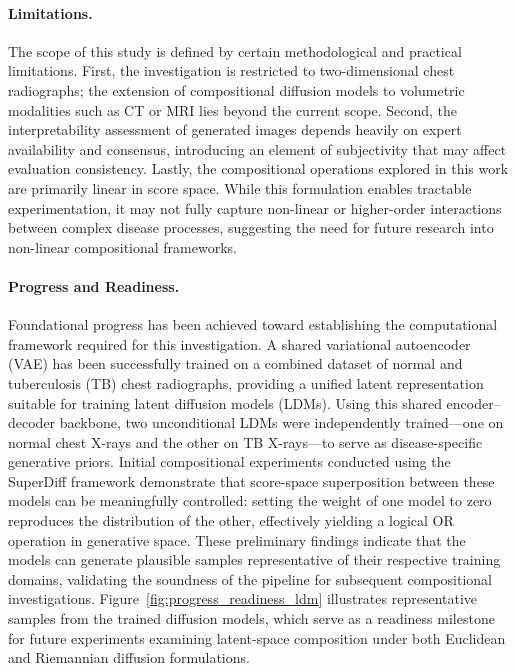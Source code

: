 \paragraph{Limitations.}
The scope of this study is defined by certain methodological and practical limitations.  
First, the investigation is restricted to two-dimensional chest radiographs; the extension of compositional diffusion models to volumetric modalities such as CT or MRI lies beyond the current scope.  
Second, the interpretability assessment of generated images depends heavily on expert availability and consensus, introducing an element of subjectivity that may affect evaluation consistency.  
Lastly, the compositional operations explored in this work are primarily linear in score space.  
While this formulation enables tractable experimentation, it may not fully capture non-linear or higher-order interactions between complex disease processes, suggesting the need for future research into non-linear compositional frameworks.


\paragraph{Progress and Readiness.}
Foundational progress has been achieved toward establishing the computational framework required for this investigation.  
A shared variational autoencoder (VAE) has been successfully trained on a combined dataset of normal and tuberculosis (TB) chest radiographs, providing a unified latent representation suitable for training latent diffusion models (LDMs).  
Using this shared encoder–decoder backbone, two unconditional LDMs were independently trained—one on normal chest X-rays and the other on TB X-rays—to serve as disease-specific generative priors.  
Initial compositional experiments conducted using the SuperDiff framework demonstrate that score-space superposition between these models can be meaningfully controlled: setting the weight of one model to zero reproduces the distribution of the other, effectively yielding a logical OR operation in generative space.  
These preliminary findings indicate that the models can generate plausible samples representative of their respective training domains, validating the soundness of the pipeline for subsequent compositional investigations.  
Figure~\ref{fig:progress_readiness_ldm} illustrates representative samples from the trained diffusion models, which serve as a readiness milestone for future experiments examining latent-space composition under both Euclidean and Riemannian diffusion formulations.

